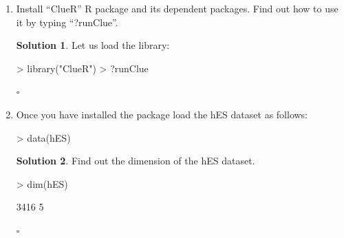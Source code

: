 \documentclass[twoside]{article}
\theoremstyle{definition}
\newtheorem*{solutionT}{Solution}
\newenvironment{solution}{\begin{cBox}\begin{solutionT}}{\hfill{\scriptsize\ensuremath{\square}}\end{solutionT}\end{cBox}}
\theoremstyle{definition}
\begin{document}
\begin{enumerate}
  \item Install “ClueR” R package and its dependent packages. Find out how to use it by
typing “?runClue”.
\begin{solution}
Let us load the library:
\begin{Schunk}
\begin{Sinput}
> library("ClueR")
> ?runClue
\end{Sinput}
\end{Schunk}

\end{solution}
\item Once you have installed the package load the hES dataset as follows:

\begin{Schunk}
\begin{Sinput}
> data(hES)
\end{Sinput}
\end{Schunk}
\begin{solution}
Find out the dimension of the hES dataset.
\begin{Schunk}
\begin{Sinput}
> dim(hES)
\end{Sinput}
\begin{Soutput}
[1] 3416    5
\end{Soutput}
\end{Schunk}
\end{solution}


\end{enumerate}
\end{document}
